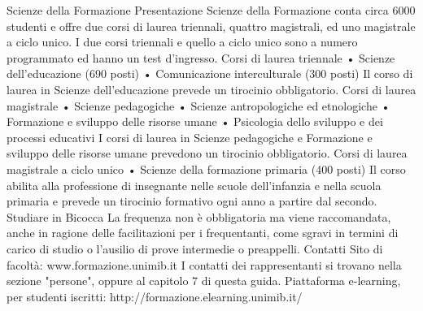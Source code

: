 Scienze della Formazione
Presentazione
Scienze della Formazione conta circa 6000 studenti e offre due corsi di laurea triennali, quattro magistrali, ed uno magistrale a ciclo unico. I due corsi triennali e quello a ciclo unico sono a numero programmato ed hanno un test d'ingresso. 
Corsi di laurea triennale
     • Scienze dell'educazione (690 posti)
     • Comunicazione interculturale (300 posti) 
Il corso di laurea in Scienze dell'educazione prevede un tirocinio obbligatorio.
Corsi di laurea magistrale
     • Scienze pedagogiche 
     • Scienze antropologiche ed etnologiche 
     • Formazione e sviluppo delle risorse umane 
     • Psicologia dello sviluppo e dei processi educativi 
I corsi di laurea in Scienze pedagogiche e Formazione e sviluppo delle risorse umane prevedono un tirocinio obbligatorio.
Corsi di laurea magistrale a ciclo unico
     • Scienze della formazione primaria (400 posti) 
Il corso abilita alla professione di insegnante nelle scuole dell'infanzia e nella scuola primaria e prevede un tirocinio formativo ogni anno a partire dal secondo.
Studiare in Bicocca
La frequenza non è obbligatoria ma viene raccomandata, anche in ragione delle facilitazioni per i frequentanti, come sgravi in termini di carico di studio o l'ausilio di prove intermedie o preappelli. 
Contatti
Sito di facoltà: www.formazione.unimib.it 
I contatti dei rappresentanti si trovano nella sezione "persone", oppure al capitolo 7 di questa guida. 
Piattaforma e-learning, per studenti iscritti: http://formazione.elearning.unimib.it/ 
